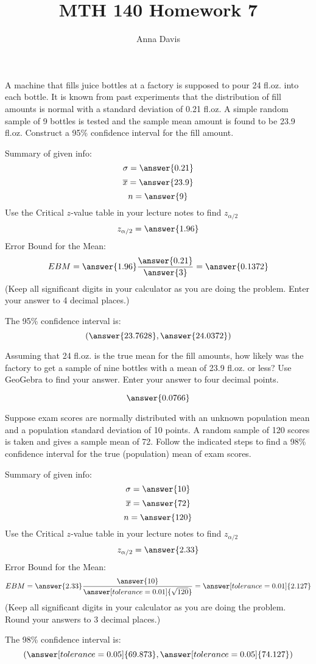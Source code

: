 \documentclass{ximera}
\author{Anna Davis} \title{MTH 140 Homework 7}
\begin{document}
\begin{abstract}

\end{abstract}
\maketitle
\begin{problem}\label{prob:140hom6prob5}
A machine that fills juice bottles at a factory is supposed to pour 24 fl.oz. into each bottle.  It is known from past experiments that the distribution of fill amounts is normal with a standard deviation of 0.21 fl.oz. A simple random sample of 9 bottles is tested and the sample mean amount is found to be 23.9 fl.oz.  Construct a 95\% confidence interval for the fill amount. 

Summary of given info:
$$\sigma=\answer{0.21}$$
$$\overline{x}=\answer{23.9}$$
$$n=\answer{9}$$
Use the Critical $z$-value table in your lecture notes to find $z_{\alpha/2}$
$$z_{\alpha/2}=\answer{1.96}$$
Error Bound for the Mean:
$$EBM=\answer{1.96}\frac{\answer{0.21}}{\answer{3}}=\answer{0.1372}$$
(Keep all significant digits in your calculator as you are doing the problem.  Enter your answer to 4 decimal places.)

The 95\% confidence interval is:
$$(\answer{23.7628},\answer{24.0372})$$

Assuming that 24 fl.oz. is the true mean for the fill amounts, how likely was the factory to get a sample of nine bottles with a mean of 23.9 fl.oz. or less?  Use GeoGebra to find your answer.  Enter your answer to four decimal points.
\begin{center}  
\end{center}
$$\answer{0.0766}$$
\end{problem}


\begin{problem}\label{prob:140hom6prob4}
Suppose exam scores are normally distributed with an unknown population mean and a population standard deviation of 10 points. A random sample of 120 scores is taken and gives a sample mean of 72. Follow the indicated steps to find a 98\% confidence interval for the true (population) mean of exam scores.

Summary of given info:
$$\sigma=\answer{10}$$
$$\overline{x}=\answer{72}$$
$$n=\answer{120}$$
Use the Critical $z$-value table in your lecture notes to find $z_{\alpha/2}$
$$z_{\alpha/2}=\answer{2.33}$$
Error Bound for the Mean:
$$EBM=\answer{2.33}\frac{\answer{10}}{\answer[tolerance=0.01]{\sqrt{120}}}=\answer[tolerance=0.01]{2.127}$$
(Keep all significant digits in your calculator as you are doing the problem.  Round your answers to 3 decimal places.)

The 98\% confidence interval is:
$$(\answer[tolerance=0.05]{69.873},\answer[tolerance=0.05]{74.127})$$
\end{problem}
\end{document}
